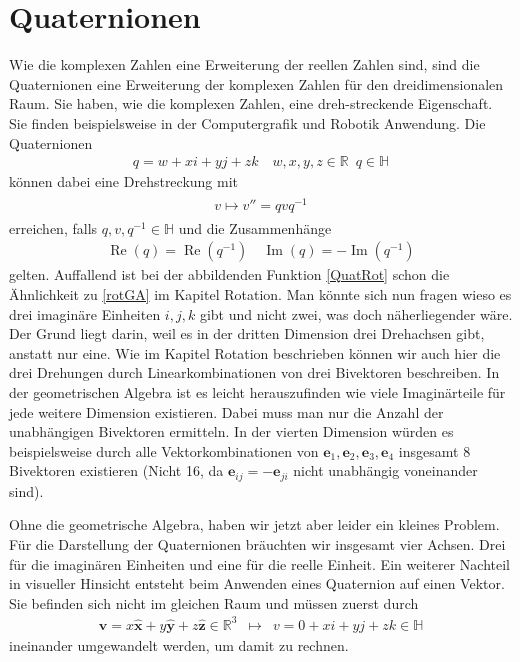 %
%
%
\section{Quaternionen}

Wie die komplexen Zahlen eine Erweiterung der reellen Zahlen sind, sind die Quaternionen eine Erweiterung der komplexen Zahlen für den dreidimensionalen Raum. Sie haben, wie die komplexen Zahlen, eine dreh-streckende Eigenschaft.
Sie finden beispielsweise in der Computergrafik und Robotik Anwendung.
Die Quaternionen
\begin{align}
	q = w + xi + yj + zk \quad w,x,y,z \in \mathbb{R}\enspace q \in \mathbb{H}
\end{align}
können dabei eine Drehstreckung mit
\begin{align} \label{QuatRot}
	\begin{split} 
		v \mapsto v'' = qvq^{-1}
	\end{split}
\end{align}
erreichen, falls $q,v,q^{-1} \in \mathbb{H}$ und die Zusammenhänge
\begin{align}
	\operatorname{Re}(q) = \operatorname{Re}(q^{-1})\quad \operatorname{Im}(q) = -\operatorname{Im}(q^{-1})
\end{align}
gelten. Auffallend ist bei der abbildenden Funktion \eqref{QuatRot} schon die Ähnlichkeit zu \eqref{rotGA} im Kapitel Rotation. Man könnte sich nun fragen wieso es drei imaginäre Einheiten $i,j,k$ gibt und nicht zwei, was doch näherliegender wäre. Der Grund liegt darin, weil es in der dritten Dimension drei Drehachsen gibt, anstatt nur eine. Wie im Kapitel Rotation beschrieben können wir auch hier die drei Drehungen durch Linearkombinationen von drei Bivektoren beschreiben. In der geometrischen Algebra ist es leicht herauszufinden wie viele Imaginärteile für jede weitere Dimension existieren. Dabei muss man nur die Anzahl der unabhängigen Bivektoren ermitteln. In der vierten Dimension würden es beispielsweise durch alle Vektorkombinationen von $\mathbf{e}_1, \mathbf{e}_2,\mathbf{e}_3, \mathbf{e}_4$ insgesamt 8 Bivektoren existieren (Nicht 16, da $\mathbf{e}_{ij} = -\mathbf{e}_{ji}$ nicht unabhängig voneinander sind).

Ohne die geometrische Algebra, haben wir jetzt aber leider ein kleines Problem. Für die Darstellung der Quaternionen bräuchten wir insgesamt vier Achsen. Drei für die imaginären Einheiten und eine für die reelle Einheit. Ein weiterer Nachteil in visueller Hinsicht entsteht beim Anwenden eines Quaternion auf einen Vektor. Sie befinden sich nicht im gleichen Raum und müssen zuerst durch
\begin{align}
	\mathbf{v} = x\mathbf{\hat{x}} + y\mathbf{\hat{y}} + z \mathbf{\hat{z}} \in \mathbb{R}^3 \enspace\mapsto\enspace v = 0 + xi + yj + zk \in \mathbb{H}
\end{align}
ineinander umgewandelt werden, um damit zu rechnen.

